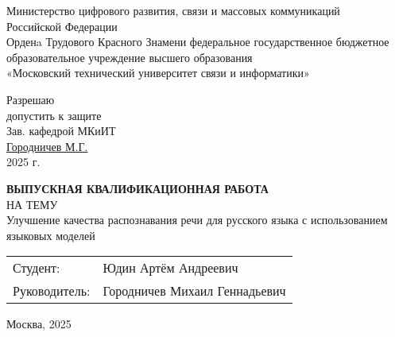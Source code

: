 


\newpage

\thispagestyle{empty}
\begin{center}
Министерство цифрового развития, связи и массовых коммуникаций\\
Российской Федерации\\
Орденa Трудового Красного Знамени федеральное государственное бюджетное образовательное учреждение высшего образования\\
«Московский технический университет связи и информатики»
\end{center}
\vspace{0.5cm}
\noindent Разрешаю\\
\noindent допустить к защите\\
\noindent Зав. кафедрой МКиИТ\\
\noindent \underline{Городничев М.Г.}\\
\noindent \underline{\hspace{3.5cm}} 2025 г.
\vspace{1cm}

\begin{center}
\fontsize{18pt}{20pt}\selectfont
\textbf{ВЫПУСКНАЯ КВАЛИФИКАЦИОННАЯ РАБОТА}\\
\fontsize{12pt}{20pt}\selectfont
НА ТЕМУ\\
\fontsize{16pt}{20pt}\selectfont
Улучшение качества распознавания речи для русского языка с использованием языковых моделей
\end{center}

\vspace{0pt plus3fill}
\fontsize{14pt}{14pt}
\begin{tabular}{@{}ll@{}}
Студент: & \underline{\hspace{3cm}} Юдин Артём Андреевич \\
Руководитель: & \underline{\hspace{3cm}} Городничев Михаил Геннадьевич
\end{tabular}

\vspace{0pt plus6fill}
\begin{center}
    Москва, 2025
\end{center}